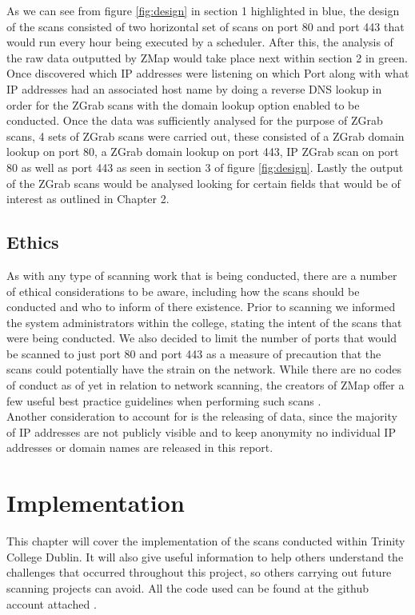 \documentclass[a4wide,leqno,12pt]{report}
\begin{document}
As we can see from figure \ref{fig:design} in section 1 highlighted in blue,
the design of the scans consisted of two horizontal set of scans on port 80 and port 443 that would run every hour being executed by a scheduler. After this, the analysis of the raw data outputted by ZMap would take place next within section 2 in green. Once discovered which IP addresses were listening on which Port along with what IP addresses had an associated host name by doing a reverse DNS lookup in order for the ZGrab scans with the domain lookup option enabled to be conducted. Once the data was sufficiently analysed for the purpose of ZGrab scans, 4 sets of ZGrab scans were carried out, these consisted of a ZGrab domain lookup on port 80, a ZGrab domain lookup on port 443, IP ZGrab scan on port 80 as well as port 443 as seen in section 3 of figure \ref{fig:design}. Lastly the output of the ZGrab scans would be analysed looking for certain fields that would be of interest as outlined in Chapter 2.

\section{Ethics}
As with any type of scanning work that is being conducted, there are a number of ethical considerations to be aware, including how the scans should be conducted and who to inform of there existence. Prior to scanning we informed the system administrators within the college, stating the intent of the scans that were being conducted. We also decided to limit the number of ports that would be scanned to just port 80 and port 443 as a measure of precaution that the scans could potentially have the strain on the network. While there are no codes of conduct as of yet in relation to network scanning, the creators of ZMap offer a few useful best practice guidelines when performing such scans\cite{durumeric2015search} \cite{durumeric2013zmap}.\\

Another consideration to account for is the releasing of data, since the majority of IP addresses are not publicly visible and to keep anonymity no individual IP addresses or domain names are released in this report.
\chapter{Implementation}
This chapter will cover the implementation of the scans conducted within Trinity College Dublin. It will also give useful information to help others understand the challenges that occurred throughout this project, so others carrying out future scanning projects can avoid. All the code used can be found at the github account attached \cite{michaelGithub}.
\end{document}

